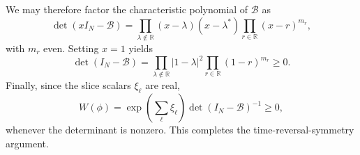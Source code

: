 \documentclass[twocolumn,aps,prb,10pt,amsmath,amssymb,amsthm,superscriptaddress]{revtex4-2}
\newcommand{\mc}[1]{\mathcal{#1}}
\theoremstyle{remark}
\begin{document}
We may therefore factor the characteristic polynomial of $\mc B$ as
\begin{equation}
    \det(xI_N-\mc B)
    = \prod_{\lambda\notin\mathbb R}(x-\lambda)(x-\lambda^*)
      \prod_{r\in\mathbb R}(x-r)^{m_r},
\end{equation}
with $m_r$ even. Setting $x=1$ yields
\begin{equation}
    \det(I_N-\mc B)
    = \prod_{\lambda\notin\mathbb R}|1-\lambda|^2
      \prod_{r\in\mathbb R}(1-r)^{m_r}
    \ge 0.
\end{equation}
Finally, since the slice scalars $\xi_\ell$ are real,
\begin{equation}
    W(\phi) = \exp\!\left(\sum_\ell \xi_\ell\right)\det(I_N-\mc B)^{-1}\ge 0,
\end{equation}
whenever the determinant is nonzero. This completes the time-reversal-symmetry argument.
\end{document}
